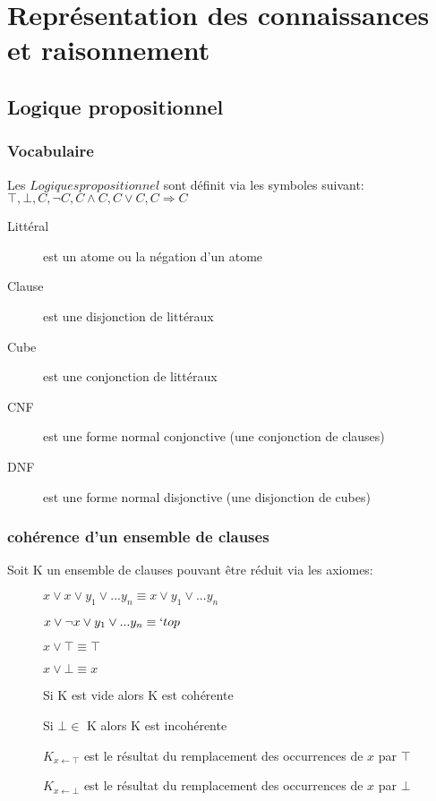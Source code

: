 \part{Représentation des connaissances et raisonnement}
\pagebreak

\chapter{Logique propositionnel}\pagebreak
\section{Vocabulaire}
Les $Logiques propositionnel$ sont définit via les symboles suivant:\\
$\top, \bot, C, \neg C, C \wedge C, C \vee C, C \Rightarrow C$ \\

\begin{description}
\item[Littéral] est un atome ou la négation d'un atome
\item[Clause] est une disjonction de littéraux
\item[Cube] est une conjonction de littéraux
\item[CNF] est une forme normal conjonctive (une conjonction de clauses)
\item[DNF] est une forme normal disjonctive (une disjonction de cubes)
\end{description}

\section{cohérence d'un ensemble de clauses}
Soit K un ensemble de clauses pouvant être réduit via les axiomes:
\begin{description}
\item[] $x \vee x \vee y_1 \vee ... y_n \equiv x \vee y_1 \vee ... y_n$
\item[] $x \vee \neg x \vee y_1 \vee ... y_n \equiv `top$
\item[] $x \vee \top \equiv \top$
\item[] $x \vee \bot \equiv x$
\item[] Si K est vide alors K est cohérente
\item[] Si $\bot \in $ K alors K est incohérente
\item[] $K_{x \leftarrow \top}$ est le résultat du remplacement des occurrences de $x$ par $\top$
\item[] $K_{x \leftarrow \bot}$ est le résultat du remplacement des occurrences de $x$ par $\bot$
\end{description}

